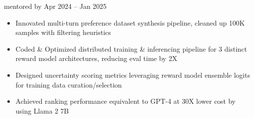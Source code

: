     {{\bodyfontsize \color{body} mentored by} }
    {Apr 2024 -- Jan 2025}{}{}
\begin{itemize}

    \item Innovated multi-turn preference dataset synthesis pipeline, cleaned up 100K samples with filtering heuristics


    \item Coded \& Optimized distributed training \& inferencing pipeline for 3 distinct reward model architectures, reducing eval time by 2X

    \item Designed uncertainty scoring metrics leveraging reward model ensemble logits for training data curation/selection

    \item Achieved ranking performance equivalent to GPT-4 at 30X lower cost by using Llama 2 7B
\end{itemize}
\dividerSmall


